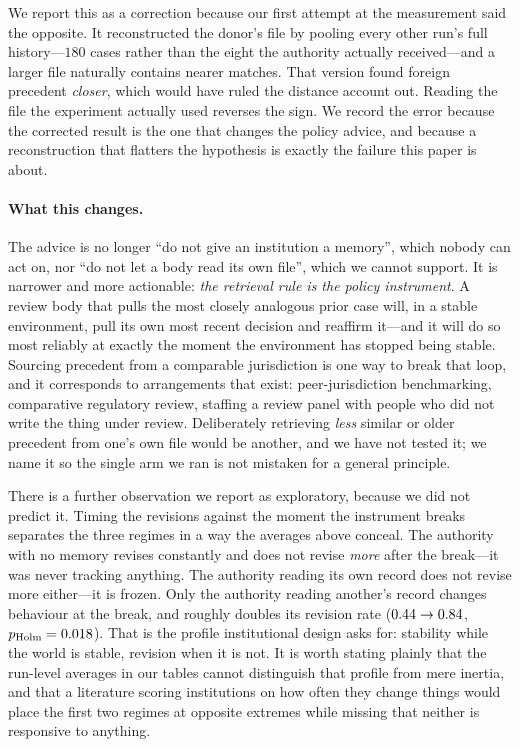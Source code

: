 \documentclass[11pt]{article}
\begin{document}
We report this as a correction because our first attempt at the measurement said the opposite. It
reconstructed the donor's file by pooling every other run's full history---$180$ cases rather than
the eight the authority actually received---and a larger file naturally contains nearer matches. That
version found foreign precedent \emph{closer}, which would have ruled the distance account out.
Reading the file the experiment actually used reverses the sign. We record the error because the
corrected result is the one that changes the policy advice, and because a reconstruction that
flatters the hypothesis is exactly the failure this paper is about.

\paragraph{What this changes.} The advice is no longer ``do not give an institution a memory'', which
nobody can act on, nor ``do not let a body read its own file'', which we cannot support. It is
narrower and more actionable: \emph{the retrieval rule is the policy instrument}. A review body that
pulls the most closely analogous prior case will, in a stable environment, pull its own most recent
decision and reaffirm it---and it will do so most reliably at exactly the moment the environment has
stopped being stable. Sourcing precedent from a comparable jurisdiction is one way to break that
loop, and it corresponds to arrangements that exist: peer-jurisdiction benchmarking, comparative
regulatory review, staffing a review panel with people who did not write the thing under review.
Deliberately retrieving \emph{less} similar or older precedent from one's own file would be another,
and we have not tested it; we name it so the single arm we ran is not mistaken for a general
principle.

There is a further observation we report as exploratory, because we did not predict it. Timing the
revisions against the moment the instrument breaks separates the three regimes in a way the averages
above conceal. The authority with no memory revises constantly and does not revise \emph{more} after
the break---it was never tracking anything. The authority reading its own record does not revise more
either---it is frozen. Only the authority reading another's record changes behaviour at the break, and
roughly doubles its revision rate ($0.44 \to 0.84$,
$p_{\text{Holm}} = 0.018$). That is the profile institutional design asks for: stability
while the world is stable, revision when it is not. It is worth stating plainly that the run-level
averages in our tables cannot distinguish that profile from mere inertia, and that a literature
scoring institutions on how often they change things would place the first two regimes at opposite
extremes while missing that neither is responsive to anything.
\end{document}
